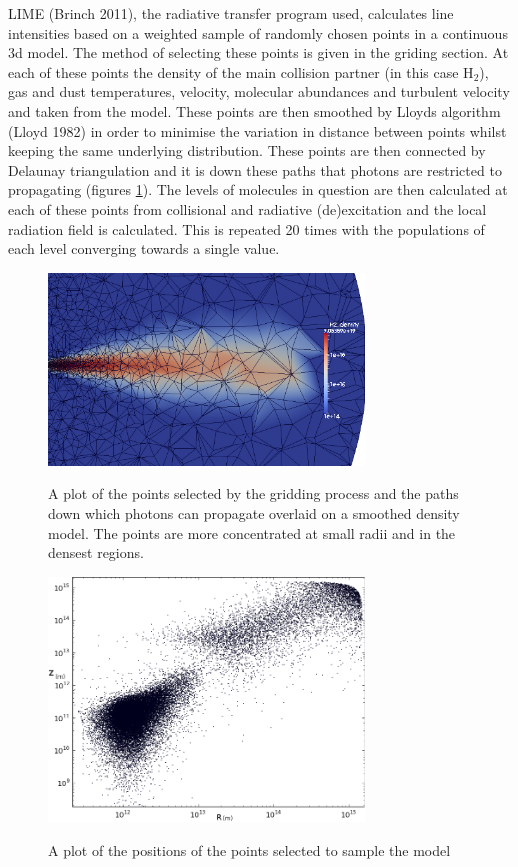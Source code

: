 \documentclass[useAMS,usenatbib]{mn2e}
\begin{document}
LIME (Brinch 2011), the radiative transfer program used, calculates line intensities based on a weighted sample of randomly chosen points in a continuous 3d model. The method of selecting these points is given in the griding section. At each of these points the density of the main collision partner (in this case H$_2$), gas and dust temperatures, velocity, molecular abundances and turbulent velocity and taken from the model. These points are then smoothed by Lloyds algorithm (Lloyd 1982) in order to minimise the variation in distance between points whilst keeping the same underlying distribution. These points are then connected by Delaunay triangulation and it is down these paths that photons are restricted to propagating (figures \ref{grid}). The levels of molecules in question are then  calculated at each of these points from collisional and radiative (de)excitation and the local radiation field is calculated. This is repeated 20 times with the populations of each level converging towards a single value.\newline


\begin{figure}
 \includegraphics[width=84mm]{Figures/model/Lime_grid3.png}
 \label{grid}
 \caption{A plot of the points selected by the gridding process and the paths down which photons can propagate overlaid on a smoothed density model. The points are more concentrated at small radii and in the densest regions.}
\end{figure}

\begin{figure}
 \includegraphics[width=84mm]{Figures/model/lime_points_rz2.png}
 \label{points}
 \caption{A plot of the positions of the points selected to sample the model}
\end{figure}
\end{document}
